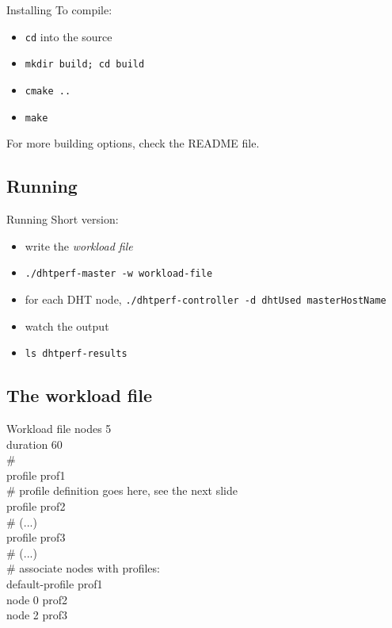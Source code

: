 \documentclass[compress]{beamer}
\begin{document}
\begin{frame}{Installing}
To compile:
\begin{itemize}
    \item \texttt{cd} into the source
    \item \texttt{mkdir build; cd build}
    \item \texttt{cmake ..}
    \item \texttt{make}
\end{itemize}
For more building options, check the README file.
\end{frame}

\subsection{Running}
\begin{frame}{Running}
Short version:
\begin{itemize}
    \item write the \emph{workload file}
    \item \texttt{./dhtperf-master -w workload-file}
    \item for each DHT node, \texttt{./dhtperf-controller -d dhtUsed
    masterHostName}
    \item watch the output
    \item \texttt{ls dhtperf-results}
\end{itemize}
\end{frame}

\subsection{The workload file}
\begin{frame}{Workload file}
nodes 5\\
duration 60\\
\#\\
profile prof1\\
\# profile definition goes here, see the next slide\\
profile prof2\\
\# (...)\\
profile prof3\\
\# (...)\\
\# associate nodes with profiles:\\
default-profile prof1\\
node 0 prof2\\
node 2 prof3
\end{frame}
\end{document}
